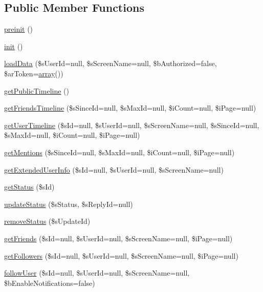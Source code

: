 \subsection*{Public Member Functions}
\begin{DoxyCompactItemize}
\item 
\hyperlink{classCPSTwitterApi_a2dc262e99b1c246b56f27626bfe699ff}{preinit} ()
\item 
\hyperlink{classCPSTwitterApi_a4be4055f3361d4800e16bc2e2e38cda6}{init} ()
\item 
\hyperlink{classCPSTwitterApi_a68d63ce777ce2fa96d0d9d1111f1dcf3}{loadData} (\$sUserId=null, \$sScreenName=null, \$bAuthorized=false, \$arToken=\hyperlink{list_8php_aa3205d038c7f8feb5c9f01ac4dfadc88}{array}())
\item 
\hyperlink{classCPSTwitterApi_ab648e79d4c7934898e0bd99f42c18739}{getPublicTimeline} ()
\item 
\hyperlink{classCPSTwitterApi_a1443891e087408247ab5765b137e620a}{getFriendsTimeline} (\$sSinceId=null, \$sMaxId=null, \$iCount=null, \$iPage=null)
\item 
\hyperlink{classCPSTwitterApi_a4103b1ac27bbc0f3db1ab71b88f93f19}{getUserTimeline} (\$sId=null, \$sUserId=null, \$sScreenName=null, \$sSinceId=null, \$sMaxId=null, \$iCount=null, \$iPage=null)
\item 
\hyperlink{classCPSTwitterApi_aa33675ca1276678f5eb1ce153ecb3fc0}{getMentions} (\$sSinceId=null, \$sMaxId=null, \$iCount=null, \$iPage=null)
\item 
\hyperlink{classCPSTwitterApi_aecef2258ad5d95f208137cde146eeece}{getExtendedUserInfo} (\$sId=null, \$sUserId=null, \$sScreenName=null)
\item 
\hyperlink{classCPSTwitterApi_a45f7d4e1a2489c032892a17b5dbb63c6}{getStatus} (\$sId)
\item 
\hyperlink{classCPSTwitterApi_a437a821105446fde9bbcb7ebef307f5f}{updateStatus} (\$sStatus, \$sReplyId=null)
\item 
\hyperlink{classCPSTwitterApi_a287662639ab89a546820fb50aee09b6d}{removeStatus} (\$sUpdateId)
\item 
\hyperlink{classCPSTwitterApi_a347c20ca09a1414e7094511ff60a6572}{getFriends} (\$sId=null, \$sUserId=null, \$sScreenName=null, \$iPage=null)
\item 
\hyperlink{classCPSTwitterApi_a3a143ff80682ae9079e7ab4e8d0239ca}{getFollowers} (\$sId=null, \$sUserId=null, \$sScreenName=null, \$iPage=null)
\item 
\hyperlink{classCPSTwitterApi_a65767389416ea450315483ef34d9c317}{followUser} (\$sId=null, \$sUserId=null, \$sScreenName=null, \$bEnableNotifications=false)

\end{DoxyCompactItemize}
